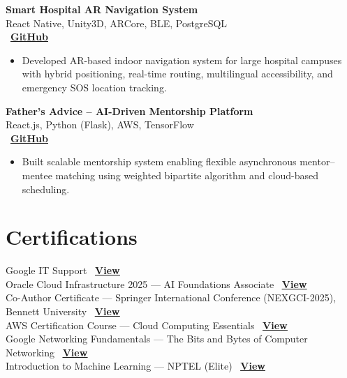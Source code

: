 \documentclass[a4paper,11pt]{article}
\begin{document}
\textbf{Smart Hospital AR Navigation System} \\
React Native, Unity3D, ARCore, BLE, PostgreSQL \\
\faGithub\,
\href{https://github.com/Satendra-Soraiya/AIIMS-CAMPUS-NAVIGATION}{\underline{\textbf{GitHub}}}
\begin{itemize}
    \item Developed AR-based indoor navigation system for large hospital campuses with hybrid positioning, real-time routing, multilingual accessibility, and emergency SOS location tracking.
\end{itemize}

\textbf{Father’s Advice – AI-Driven Mentorship Platform} \\
React.js, Python (Flask), AWS, TensorFlow \\
\faGithub\,
\href{https://github.com/Satendra-Soraiya/fathers-advice}{\underline{\textbf{GitHub}}}
\begin{itemize}
    \item Built scalable mentorship system enabling flexible asynchronous mentor–mentee matching using weighted bipartite algorithm and cloud-based scheduling.
\end{itemize}


\section*{Certifications}

Google IT Support \hfill 
{}\,
\href{https://drive.google.com/file/d/1PZeVDDU93DBNBWM4Koq7wIxLjsTi3Qaw/view?usp=sharing}{\underline{\textbf{View}}} \\
Oracle Cloud Infrastructure 2025 — AI Foundations Associate \hfill 
{}\,
\href{https://drive.google.com/file/d/1_Ja92BJ-__mfTT5G7faFPubjpll79Vh-/view?usp=sharing}{\underline{\textbf{View}}} \\
Co-Author Certificate — Springer International Conference (NEXGCI-2025), Bennett University \hfill 
{}\,
\href{https://drive.google.com/file/d/1xQ6dSbadfDfXjsi-54HvNkWsDyQ3RYmR/view?usp=sharing}{\underline{\textbf{View}}} \\
AWS Certification Course — Cloud Computing Essentials \hfill 
{}\,
\href{https://drive.google.com/file/d/14Y87HaOt5r68x6JTBBgS1WmNQZu5n0CE/view?usp=sharing}{\underline{\textbf{View}}} \\
Google Networking Fundamentals — The Bits and Bytes of Computer Networking \hfill 
{}\,
\href{https://drive.google.com/file/d/1ncyPC26jO-LvHz-iogiYDGYfBM8UXYRc/view?usp=sharing}{\underline{\textbf{View}}} \\
Introduction to Machine Learning — NPTEL (Elite) \hfill 
{}\,
\href{https://drive.google.com/file/d/1MX6pMYQg84mFTuTyK-_vJXx_7DQLOlqL/view?usp=sharing}{\underline{\textbf{View}}}
\end{document}
